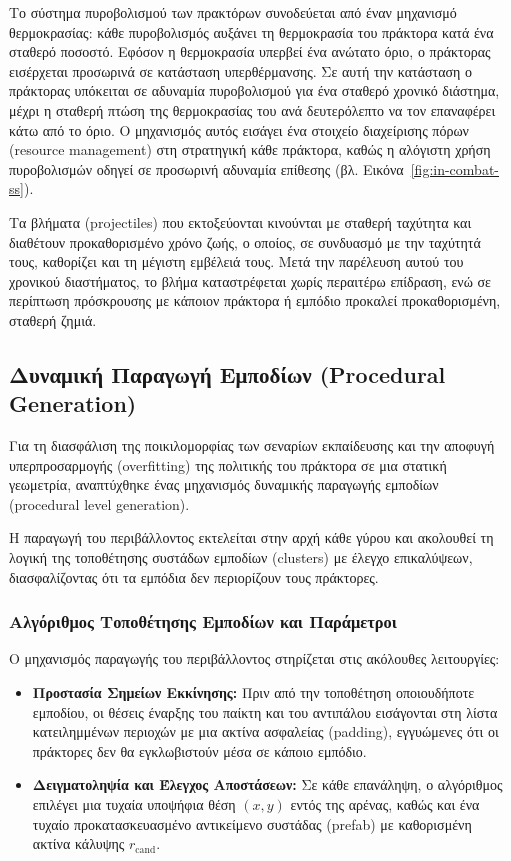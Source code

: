\documentclass[12pt]{article}
\begin{document}
Το σύστημα πυροβολισμού των πρακτόρων συνοδεύεται από έναν μηχανισμό θερμοκρασίας: κάθε πυροβολισμός αυξάνει τη θερμοκρασία του πράκτορα κατά ένα σταθερό ποσοστό. Εφόσον η θερμοκρασία υπερβεί ένα ανώτατο όριο, ο πράκτορας εισέρχεται προσωρινά σε κατάσταση υπερθέρμανσης. Σε αυτή την κατάσταση ο πράκτορας υπόκειται σε αδυναμία πυροβολισμού για ένα σταθερό χρονικό διάστημα, μέχρι η σταθερή πτώση της θερμοκρασίας του ανά δευτερόλεπτο να τον επαναφέρει κάτω από το όριο. Ο μηχανισμός αυτός εισάγει ένα στοιχείο διαχείρισης πόρων (resource management) στη στρατηγική κάθε πράκτορα, καθώς η αλόγιστη χρήση πυροβολισμών οδηγεί σε προσωρινή αδυναμία επίθεσης (βλ. Εικόνα~\ref{fig:in-combat-ss}).

Τα βλήματα (projectiles) που εκτοξεύονται κινούνται με σταθερή ταχύτητα και διαθέτουν προκαθορισμένο χρόνο ζωής, ο οποίος, σε συνδυασμό με την ταχύτητά τους, καθορίζει και τη μέγιστη εμβέλειά τους. Μετά την παρέλευση αυτού του χρονικού διαστήματος, το βλήμα καταστρέφεται χωρίς περαιτέρω επίδραση, ενώ σε περίπτωση πρόσκρουσης με κάποιον πράκτορα ή εμπόδιο προκαλεί προκαθορισμένη, σταθερή ζημιά.

\subsection{Δυναμική Παραγωγή Εμποδίων (Procedural Generation)}

Για τη διασφάλιση της ποικιλομορφίας των σεναρίων εκπαίδευσης και την αποφυγή υπερπροσαρμογής (overfitting) της πολιτικής του πράκτορα σε μια στατική γεωμετρία, αναπτύχθηκε ένας μηχανισμός δυναμικής παραγωγής εμποδίων (procedural level generation). 

Η παραγωγή του περιβάλλοντος εκτελείται στην αρχή κάθε γύρου και ακολουθεί τη λογική της τοποθέτησης συστάδων εμποδίων (clusters) με έλεγχο επικαλύψεων, διασφαλίζοντας ότι τα εμπόδια δεν περιορίζουν τους πράκτορες.

\subsubsection{Αλγόριθμος Τοποθέτησης Εμποδίων και Παράμετροι}
Ο μηχανισμός παραγωγής του περιβάλλοντος στηρίζεται στις ακόλουθες λειτουργίες:

\begin{itemize}
    \item \textbf{Προστασία Σημείων Εκκίνησης:} Πριν από την τοποθέτηση οποιουδήποτε εμποδίου, οι θέσεις έναρξης του παίκτη και του αντιπάλου εισάγονται στη λίστα κατειλημμένων περιοχών με μια ακτίνα ασφαλείας (padding), εγγυώμενες ότι οι πράκτορες δεν θα εγκλωβιστούν μέσα σε κάποιο εμπόδιο.
    
    \item \textbf{Δειγματοληψία και Έλεγχος Αποστάσεων:} Σε κάθε επανάληψη, ο αλγόριθμος επιλέγει μια τυχαία υποψήφια θέση $(x, y)$ εντός της αρένας, καθώς και ένα τυχαίο προκατασκευασμένο αντικείμενο συστάδας (prefab) με καθορισμένη ακτίνα κάλυψης $r_{\text{cand}}$.
\end{itemize}
\end{document}
